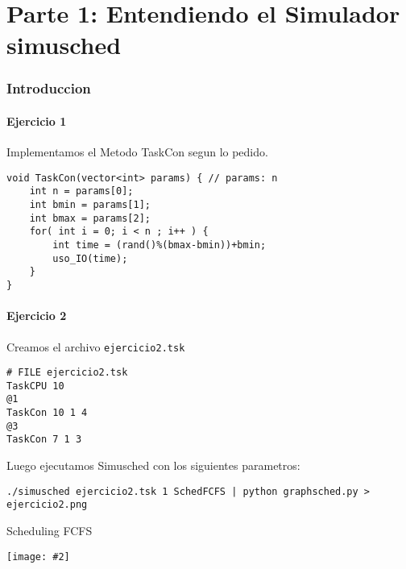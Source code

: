 \documentclass[a4paper, 10pt, notitlepage]{article}
\def\imagen#1#2#3{\vskip0.5cm
{\large #3}
\begin{center}
\texttt{[image: \#2]}
\end{center}}
\begin{document}
\footspace{1cm}

\maketitle{}

\tableofcontents







\part{Parte 1: Entendiendo el Simulador simusched}
\section{Introduccion}

\subsection{Ejercicio 1}

Implementamos el Metodo TaskCon segun lo pedido.

\begin{framed}
\begin{verbatim}
void TaskCon(vector<int> params) { // params: n
	int n = params[0];
	int bmin = params[1];
	int bmax = params[2];
	for( int i = 0; i < n ; i++ ) {
		int time = (rand()%(bmax-bmin))+bmin;
		uso_IO(time);
	}
}
\end{verbatim}
\end{framed}

\subsection{Ejercicio 2}

Creamos el archivo \verb|ejercicio2.tsk|

\begin{framed}
\begin{verbatim}
# FILE ejercicio2.tsk
TaskCPU 10
@1
TaskCon 10 1 4
@3
TaskCon 7 1 3
\end{verbatim}
\end{framed}


Luego ejecutamos Simusched con los siguientes parametros:

\verb+./simusched ejercicio2.tsk 1 SchedFCFS | python graphsched.py > ejercicio2.png+


\imagen{0.5}{img/ejercicio2.png}{Scheduling FCFS}
\end{document}
